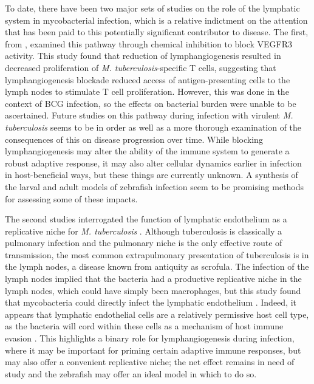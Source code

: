 To date, there have been two major sets of studies on the role of the lymphatic system in mycobacterial infection, which is a relative indictment on the attention that has been paid to this potentially significant contributor to disease. The first, from \citet{Harding2015}, examined this pathway through chemical inhibition to block VEGFR3 activity. This study found that reduction of lymphangiogenesis resulted in decreased proliferation of \textit{M. tuberculosis}-specific T cells, suggesting that lymphangiogenesis blockade reduced access of antigen-presenting cells to the lymph nodes to stimulate T cell proliferation. However, this was done in the context of BCG infection, so the effects on bacterial burden were unable to be ascertained. Future studies on this pathway during infection with virulent \textit{M. tuberculosis} seems to be in order as well as a more thorough examination of the consequences of this on disease progression over time. While blocking lymphangiogenesis may alter the ability of the immune system to generate a robust adaptive response, it may also alter cellular dynamics earlier in infection in host-beneficial ways, but these things are currently unknown. A synthesis of the larval and adult models of zebrafish infection seem to be promising methods for assessing some of these impacts.

The second studies interrogated the function of lymphatic endothelium as a replicative niche for \textit{M. tuberculosis} \citep{Lerner2016, Lerner2020}. Although tuberculosis is classically a pulmonary infection and the pulmonary niche is the only effective route of transmission, the most common extrapulmonary presentation of tuberculosis is in the lymph nodes, a disease known from antiquity as scrofula. The infection of the lymph nodes implied that the bacteria had a productive replicative niche in the lymph nodes, which could have simply been macrophages, but this study found that mycobacteria could directly infect the lymphatic endothelium \citep{Lerner2016}. Indeed, it appears that lymphatic endothelial cells are a relatively permissive host cell type, as the bacteria will cord within these cells as a mechanism of host immune evasion \citep{Lerner2020}. This highlights a binary role for lymphangiogenesis during infection, where it may be important for priming certain adaptive immune responses, but may also offer a convenient replicative niche; the net effect remains in need of study and the zebrafish may offer an ideal model in which to do so.

